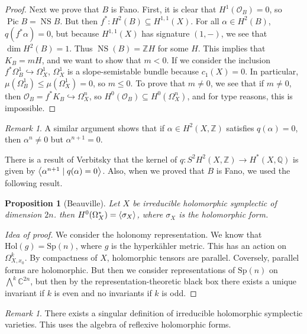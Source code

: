 \documentclass[leqno, openany]{memoir}
\newtheorem{prop}[thm]{Proposition}
\theoremstyle{definition}
\theoremstyle{remark}
\newtheorem{rmk}[thm]{Remark}
\theoremstyle{plain}
\theoremstyle{definition}
\theoremstyle{remark}
\newcommand{\C}{\mathbb{C}}
\newcommand{\Z}{\mathbb{Z}}
\newcommand{\Q}{\mathbb{Q}}
\newcommand{\mc}[1]{\mathcal{#1}}
\newcommand{\mr}[1]{\mathrm{#1}}
\DeclareMathOperator{\Pic}{Pic}
\DeclareMathOperator{\NS}{NS}
\begin{document}
\begin{proof}
    Next we prove that $B$ is Fano. First, it is clear that $H^1(\mc{O}_B) = 0$, so $\Pic B = \NS B$. But then $f^* \colon H^2(B) \subseteq H^{1,1}(X)$. For all $\alpha \in H^2(B)$, $q(f^* \alpha) = 0$, but because $H^{1,1}(X)$ has signature $(1, -)$, we see that $\dim H^2(B) = 1$. Thus $\NS(B) = \Z H$ for some $H$. This implies that $K_B = m H$, and we want to show that $m < 0$. If we consider the inclusion $f^* \Omega^1_B \hookrightarrow \Omega^1_X$, $\Omega^1_X$ is a slope-semistable bundle because $c_1(X) = 0$. In particular, $\mu(\Omega^1_{B}) \leq \mu(\Omega^1_X) = 0$, so $m \leq 0$. To prove that $m \neq 0$, we see that if $m \neq 0$, then $\mc{O}_B = f^* K_B \hookrightarrow \Omega^n_X$, so $H^0(\mc{O}_B) \subseteq H^0(\Omega^n_X)$, and for type reasons, this is impossible.
\end{proof}

\begin{rmk}
    A similar argument shows that if $\alpha \in H^2(X, \Z)$ satisfies $q(\alpha) = 0$, then $\alpha^n \neq 0$ but $\alpha^{n+1} = 0$.
\end{rmk}

There is a result of Verbitsky that the kernel of $q \colon S^2 H^2(X, \Z) \to H^*(X, \Q)$ is given by $\ev{\alpha^{n+1} \mid q(\alpha) = 0}$. Also, when we proved that $B$ is Fano, we used the following result.

\begin{prop}[Beauville]
    Let $X$ be irreducible holomorphic symplectic of dimension $2n$. then $H^0(\Omega^*_X) = \ev{\sigma_X}$, where $\sigma_X$ is the holomorphic form.
\end{prop}

\begin{proof}[Idea of proof]
    We consider the holonomy representation. We know that $\mr{Hol}(g) = \mr{Sp}(n)$, where $g$ is the hyperk\"ahler metric. This has an action on $\Omega^k_{X, x_0}$. By compactness of $X$, holomorphic tensors are parallel. Coversely, parallel forms are holomorphic. But then we consider representations of $\mr{Sp}(n)$ on $\bigwedge^k \C^{2n}$, but then by the representation-theoretic black box there exists a unique invariant if $k$ is even and no invariants if $k$ is odd.
\end{proof}

\begin{rmk}
    There exists a singular definition of irreducible holomorphic symplectic varieties. This uses the algebra of reflexive holomorphic forms.
\end{rmk}
\end{document}
